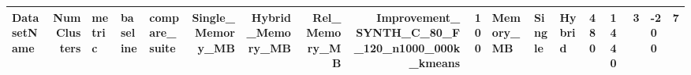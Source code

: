 \begin{tabular}{lrlllrrrrr}
\toprule
DatasetName & NumClusters & metric & baseline & compare_suite & Single_Memory_MB & Hybrid_Memory_MB & Rel_Memory_MB & Improvement_%
\midrule
SYNTH_C_80_F_120_n1000_000k_kmeans & 100 & Memory_MB & Single & Hybrid & 480 & 1440 & 3 & -200 & 7 \\
\bottomrule
\end{tabular}
